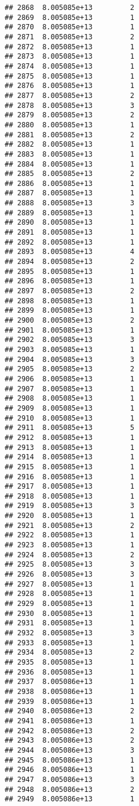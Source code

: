 \documentclass[
]{article}
\begin{document}
\begin{verbatim}
## 2868  8.005085e+13         2
## 2869  8.005085e+13         1
## 2870  8.005085e+13         1
## 2871  8.005085e+13         2
## 2872  8.005085e+13         1
## 2873  8.005085e+13         1
## 2874  8.005085e+13         1
## 2875  8.005085e+13         1
## 2876  8.005085e+13         1
## 2877  8.005085e+13         2
## 2878  8.005085e+13         3
## 2879  8.005085e+13         2
## 2880  8.005085e+13         1
## 2881  8.005085e+13         2
## 2882  8.005085e+13         1
## 2883  8.005085e+13         1
## 2884  8.005085e+13         1
## 2885  8.005085e+13         2
## 2886  8.005085e+13         1
## 2887  8.005085e+13         1
## 2888  8.005085e+13         3
## 2889  8.005085e+13         1
## 2890  8.005085e+13         1
## 2891  8.005085e+13         1
## 2892  8.005085e+13         1
## 2893  8.005085e+13         4
## 2894  8.005085e+13         2
## 2895  8.005085e+13         1
## 2896  8.005085e+13         1
## 2897  8.005085e+13         2
## 2898  8.005085e+13         1
## 2899  8.005085e+13         1
## 2900  8.005085e+13         2
## 2901  8.005085e+13         1
## 2902  8.005085e+13         3
## 2903  8.005085e+13         1
## 2904  8.005085e+13         3
## 2905  8.005085e+13         2
## 2906  8.005085e+13         1
## 2907  8.005085e+13         1
## 2908  8.005085e+13         1
## 2909  8.005085e+13         1
## 2910  8.005085e+13         1
## 2911  8.005085e+13         5
## 2912  8.005085e+13         1
## 2913  8.005085e+13         1
## 2914  8.005085e+13         1
## 2915  8.005085e+13         1
## 2916  8.005085e+13         1
## 2917  8.005085e+13         1
## 2918  8.005085e+13         1
## 2919  8.005085e+13         3
## 2920  8.005085e+13         1
## 2921  8.005085e+13         2
## 2922  8.005085e+13         1
## 2923  8.005085e+13         1
## 2924  8.005085e+13         2
## 2925  8.005085e+13         3
## 2926  8.005085e+13         3
## 2927  8.005085e+13         1
## 2928  8.005085e+13         1
## 2929  8.005085e+13         1
## 2930  8.005085e+13         1
## 2931  8.005085e+13         1
## 2932  8.005085e+13         3
## 2933  8.005085e+13         1
## 2934  8.005085e+13         2
## 2935  8.005085e+13         1
## 2936  8.005085e+13         1
## 2937  8.005086e+13         1
## 2938  8.005086e+13         1
## 2939  8.005086e+13         1
## 2940  8.005086e+13         2
## 2941  8.005086e+13         1
## 2942  8.005086e+13         2
## 2943  8.005086e+13         2
## 2944  8.005086e+13         3
## 2945  8.005086e+13         1
## 2946  8.005086e+13         1
## 2947  8.005086e+13         3
## 2948  8.005086e+13         2
## 2949  8.005086e+13         1

\end{verbatim}
\end{document}
